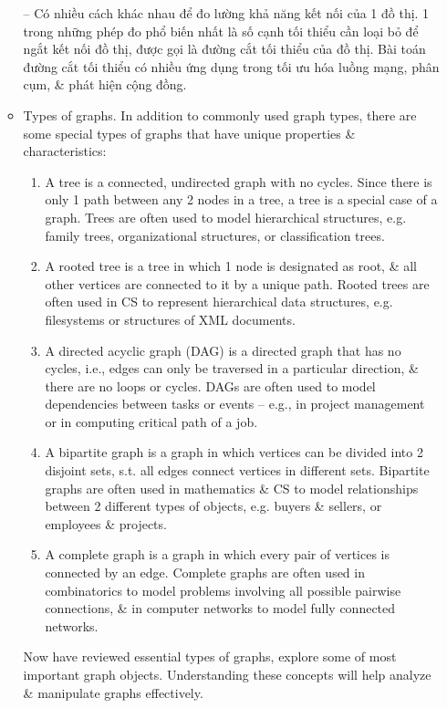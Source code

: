 \documentclass{article}
\begin{document}
\begin{itemize}
\begin{itemize}
        -- Có nhiều cách khác nhau để đo lường khả năng kết nối của 1 đồ thị. 1 trong những phép đo phổ biến nhất là số cạnh tối thiểu cần loại bỏ để ngắt kết nối đồ thị, được gọi là đường cắt tối thiểu của đồ thị. Bài toán đường cắt tối thiểu có nhiều ứng dụng trong tối ưu hóa luồng mạng, phân cụm, \& phát hiện cộng đồng.
        \item {\sf Types of graphs.} In addition to commonly used graph types, there are some special types of graphs that have unique properties \& characteristics:
        \begin{enumerate}
            \item A tree is a connected, undirected graph with no cycles. Since there is only 1 path between any 2 nodes in a tree, a tree is a special case of a graph. Trees are often used to model hierarchical structures, e.g. family trees, organizational structures, or classification trees.
            \item A rooted tree is a tree in which 1 node is designated as root, \& all other vertices are connected to it by a unique path. Rooted trees are often used in CS to represent hierarchical data structures, e.g. filesystems or structures of XML documents.
            \item A directed acyclic graph (DAG) is a directed graph that has no cycles, i.e., edges can only be traversed in a particular direction, \& there are no loops or cycles. DAGs are often used to model dependencies between tasks or events -- e.g., in project management or in computing critical path of a job.
            \item A bipartite graph is a graph in which vertices can be divided into 2 disjoint sets, s.t. all edges connect vertices in different sets. Bipartite graphs are often used in mathematics \& CS to model relationships between 2 different types of objects, e.g. buyers \& sellers, or employees \& projects.
            \item A complete graph is a graph in which every pair of vertices is connected by an edge. Complete graphs are often used in combinatorics to model problems involving all possible pairwise connections, \& in computer networks to model fully connected networks.
        \end{enumerate}
        Now have reviewed essential types of graphs, explore some of most important graph objects. Understanding these concepts will help analyze \& manipulate graphs effectively.


\end{itemize}
\end{itemize}
\end{document}
